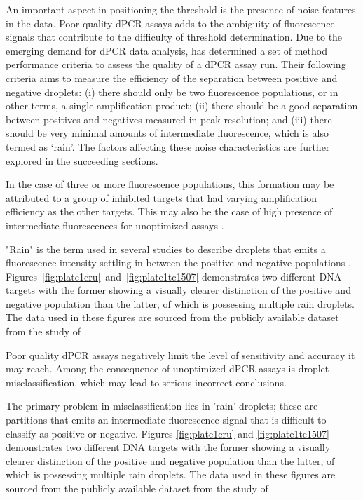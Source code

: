 An important aspect in positioning the threshold is the presence of noise features in the data. Poor quality dPCR assays adds to the ambiguity of fluorescence signals that contribute to the difficulty of threshold determination. Due to the emerging demand for dPCR data analysis,  has determined a set of method performance criteria to assess the quality of a dPCR assay run. Their following criteria aims to measure the efficiency of the separation between positive and negative droplets: (i) there should only be two fluorescence populations, or in other terms, a single amplification product; (ii) there should be a good separation between positives and negatives measured in peak resolution; and (iii) there should be very minimal amounts of intermediate fluorescence, which is also termed as ‘rain’. The factors affecting these noise characteristics are further explored in the succeeding sections. 

In the case of three or more fluorescence populations, this formation may be attributed to a group of inhibited targets that had varying amplification efficiency as the other targets. This may also be the case of high presence of intermediate fluorescences for unoptimized assays \cite{Lievens2016}.

"Rain" is the term used in several studies to describe droplets that emits a fluorescence intensity settling in between the positive and negative populations \cite{Lievens2016, Trypsteen2015, Witte2016, Dreo2014, Brink2018, Attali2016}. Figures \ref{fig:plate1cru} and \ref{fig:plate1tc1507} demonstrates two different DNA targets with the former showing a visually clearer distinction of the positive and negative population than the latter, of which is possessing multiple rain droplets. The data used in these figures are sourced from the publicly available dataset from the study of .


Poor quality dPCR assays negatively limit the level of sensitivity and accuracy it may reach. Among the consequence of unoptimized dPCR assays is droplet misclassification, which may lead to serious incorrect conclusions.

The primary problem in misclassification lies in 'rain' droplets; these are partitions that emits an intermediate fluorescence signal that is difficult to classify as positive or negative. Figures \ref{fig:plate1cru} and \ref{fig:plate1tc1507} demonstrates two different DNA targets with the former showing a visually clearer distinction of the positive and negative population than the latter, of which is possessing multiple rain droplets. The data used in these figures are sourced from the publicly available dataset from the study of . 

